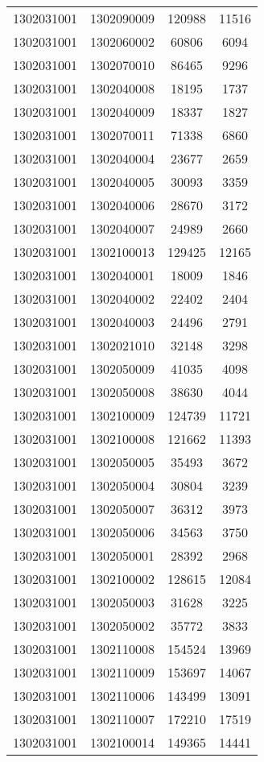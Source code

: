 \begin{longtable}{llcc}
1302031001 & 1302090009 & 120988 & 11516\\
1302031001 & 1302060002 & 60806 & 6094\\
1302031001 & 1302070010 & 86465 & 9296\\
1302031001 & 1302040008 & 18195 & 1737\\
1302031001 & 1302040009 & 18337 & 1827\\
1302031001 & 1302070011 & 71338 & 6860\\
1302031001 & 1302040004 & 23677 & 2659\\
1302031001 & 1302040005 & 30093 & 3359\\
1302031001 & 1302040006 & 28670 & 3172\\
1302031001 & 1302040007 & 24989 & 2660\\
1302031001 & 1302100013 & 129425 & 12165\\
1302031001 & 1302040001 & 18009 & 1846\\
1302031001 & 1302040002 & 22402 & 2404\\
1302031001 & 1302040003 & 24496 & 2791\\
1302031001 & 1302021010 & 32148 & 3298\\
1302031001 & 1302050009 & 41035 & 4098\\
1302031001 & 1302050008 & 38630 & 4044\\
1302031001 & 1302100009 & 124739 & 11721\\
1302031001 & 1302100008 & 121662 & 11393\\
1302031001 & 1302050005 & 35493 & 3672\\
1302031001 & 1302050004 & 30804 & 3239\\
1302031001 & 1302050007 & 36312 & 3973\\
1302031001 & 1302050006 & 34563 & 3750\\
1302031001 & 1302050001 & 28392 & 2968\\
1302031001 & 1302100002 & 128615 & 12084\\
1302031001 & 1302050003 & 31628 & 3225\\
1302031001 & 1302050002 & 35772 & 3833\\
1302031001 & 1302110008 & 154524 & 13969\\
1302031001 & 1302110009 & 153697 & 14067\\
1302031001 & 1302110006 & 143499 & 13091\\
1302031001 & 1302110007 & 172210 & 17519\\
1302031001 & 1302100014 & 149365 & 14441\\

\end{longtable}
